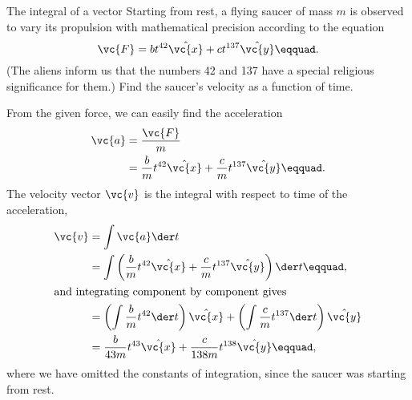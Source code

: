 \begin{eg}{The integral of a vector}
\egquestion Starting from rest, a flying saucer of mass $m$ 
is observed to vary its propulsion
with mathematical precision according to the equation
\begin{equation*}
  \vc{F} = bt^{42}\hat{\vc{x}} + ct^{137}\hat{\vc{y}}\eqquad. \\
\end{equation*}
(The aliens inform us that the numbers 42 and 137 have a special religious
significance for them.) Find the saucer's velocity as a function of time.

\eganswer From the given force, we can easily find the acceleration
\begin{align*}
  \vc{a} &= \frac{\vc{F}}{m} \\
         &= \frac{b}{m}t^{42}\hat{\vc{x}} + \frac{c}{m}t^{137}\hat{\vc{y}}\eqquad. 
\end{align*}
The velocity vector $\vc{v}$ is the integral with respect
to time of the acceleration,
\begin{align*}
  \vc{v} &= \int \vc{a} \der t \\
         &= \int \left( \frac{b}{m}t^{42}\hat{\vc{x}} + \frac{c}{m}t^{137}\hat{\vc{y}} \right) \der t\eqquad, \\
\intertext{and integrating component by component gives}
         &= \left( \int \frac{b}{m}t^{42} \der t \right) \hat{\vc{x}} + \left( \int \frac{c}{m}t^{137} \der t\right) \hat{\vc{y}}\\
         &= \frac{b}{43m}t^{43} \hat{\vc{x}} + \frac{c}{138m}t^{138}\hat{\vc{y}}\eqquad,
\end{align*}
where we have omitted the constants of integration, since the saucer was starting from rest.
\end{eg}


